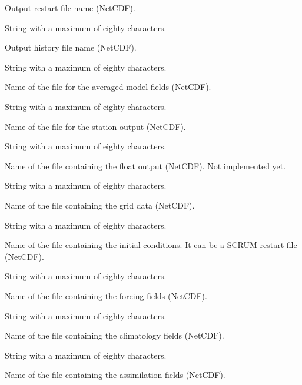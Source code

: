 \begin{klist}
     \begin{klist}
         Output restart file name (NetCDF).
     \end{klist}
     String with a maximum of eighty characters.
     \begin{klist}
         Output history file name (NetCDF).
     \end{klist}
     String with a maximum of eighty characters.
     \begin{klist}
         Name of the file for the averaged model fields
     (NetCDF).
     \end{klist}
     String with a maximum of eighty characters.
     \begin{klist}
         Name of the file for the station output
    (NetCDF).
     \end{klist}
     String with a maximum of eighty characters.
     \begin{klist}
         Name of the file containing the float output
     (NetCDF). Not implemented yet.
     \end{klist}
     String with a maximum of eighty characters.
     \begin{klist}
         Name of the file containing the grid data
     (NetCDF).
     \end{klist}
     String with a maximum of eighty characters.
     \begin{klist}
         Name of the file containing the initial
     conditions.  It can be a SCRUM restart file (NetCDF).
     \end{klist}
     String with a maximum of eighty characters.
     \begin{klist}
         Name of the file containing the forcing fields
     (NetCDF).
     \end{klist}
     String with a maximum of eighty characters.
     \begin{klist}
         Name of the file containing the climatology
     fields (NetCDF).
     \end{klist}
     String with a maximum of eighty characters.
     \begin{klist}
         Name of the file containing the assimilation
     fields (NetCDF).
     \end{klist}

\end{klist}
